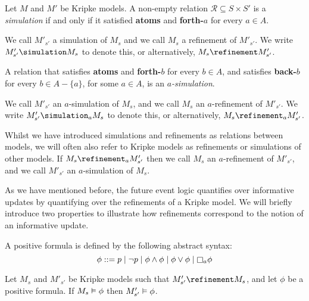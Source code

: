 \begin{definition}
Let $M$ and $M'$ be Kripke models. A non-empty relation $\mathcal{R}
\subseteq S \times S'$ is a \textit{simulation} if and only if it satisfied {\bf
atoms} and {\bf forth-$a$} for every $a \in A$.

We call $M'_{s'}$ a simulation of $M_s$ and we call $M_s$ a refinement of
$M'_{s'}$. We write $M'_{s'} \simulation M_s$ to denote this, or alternatively,
$M_s \refinement M'_{s'}$.

A relation that satisfies {\bf atoms} and {\bf forth-$b$} for every $b \in A$,
and satisfies {\bf back-$b$} for every $b \in A - \{a\}$, for some $a \in A$, is
an $a$\textit{-simulation}. 

We call $M'_{s'}$ an $a$-simulation of $M_s$, and we call $M_s$ an
$a$-refinement of $M'_{s'}$. We write $M'_{s'} \simulation_a M_s$ to denote
this, or alternatively, $M_s \refinement_a M'_{s'}$.
\end{definition}

Whilst we have introduced simulations and refinements as relations between
models, we will often also refer to Kripke models as refinements or simulations
of other models. If $M_s \refinement_a M'_{s'}$ then we call $M_s$ an
$a$-refinement of $M'_{s'}$, and we call $M'_{s'}$ an $a$-simulation of $M_s$.

As we have mentioned before, the future event logic quantifies over informative
updates by quantifying over the refinements of a Kripke model. We will briefly
introduce two properties to illustrate how refinements correspond to the notion
of an informative update.

\begin{definition}
A positive formula is defined by the following abstract syntax:
$$
\phi ::=    p \bnfalt 
            \neg p \bnfalt
            \phi \land \phi \bnfalt
            \phi \lor \phi \bnfalt
            \knows_a \phi
$$
\end{definition}

\begin{proposition}
Let $M_s$ and $M'_{s'}$ be Kripke models such that $M'_{s'} \refinement M_s$,
and let $\phi$ be a positive formula. If $M_s \vDash \phi$ then $M'_{s'}
\vDash \phi$.
\end{proposition}

